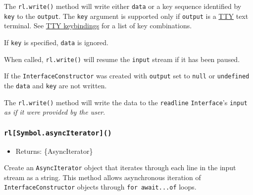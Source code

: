 The \texttt{rl.write()} method will write either \texttt{data} or a key
sequence identified by \texttt{key} to the \texttt{output}. The
\texttt{key} argument is supported only if \texttt{output} is a
\href{tty.md}{TTY} text terminal. See \hyperref[tty-keybindings]{TTY
keybindings} for a list of key combinations.

If \texttt{key} is specified, \texttt{data} is ignored.

When called, \texttt{rl.write()} will resume the \texttt{input} stream
if it has been paused.

If the \texttt{InterfaceConstructor} was created with \texttt{output}
set to \texttt{null} or \texttt{undefined} the \texttt{data} and
\texttt{key} are not written.

\begin{Shaded}
\begin{Highlighting}[]
\NormalTok{(}\NormalTok{)}\OperatorTok{;}
\NormalTok{(}\OperatorTok{,}\NormalTok{ \{ }\OperatorTok{:} \OperatorTok{,} \OperatorTok{:} \NormalTok{ \})}\OperatorTok{;}
\end{Highlighting}
\end{Shaded}

The \texttt{rl.write()} method will write the data to the
\texttt{readline} \texttt{Interface}'s \texttt{input} \emph{as if it
were provided by the user}.

\subsubsection{\texorpdfstring{\texttt{rl{[}Symbol.asyncIterator{]}()}}{rl{[}Symbol.asyncIterator{]}()}}\label{rlsymbol.asynciterator}

\begin{itemize}
\tightlist
\item
  Returns: \{AsyncIterator\}
\end{itemize}

Create an \texttt{AsyncIterator} object that iterates through each line
in the input stream as a string. This method allows asynchronous
iteration of \texttt{InterfaceConstructor} objects through
\texttt{for\ await...of} loops.

